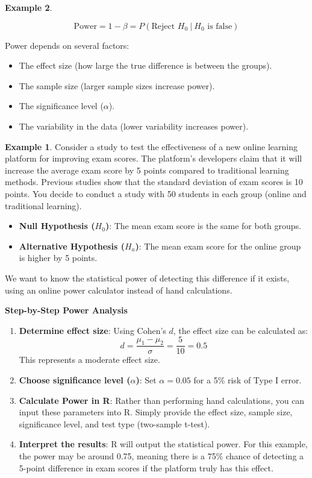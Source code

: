 \documentclass[
  11pt,
  oneside]{book}
\theoremstyle{definition}
\theoremstyle{definition}
\newtheorem{example}{Example}[chapter]
\theoremstyle{definition}
\theoremstyle{definition}
\theoremstyle{remark}
\begin{document}
\begin{example}
\begin{itemize}
  \[
  \text{Power} = 1 - \beta = P(\text{Reject } H_0 \>|\> H_0 \text{ is false})
  \]
\end{itemize}

Power depends on several factors:

\begin{itemize}
\item
  The effect size (how large the true difference is between the groups).
\item
  The sample size (larger sample sizes increase power).
\item
  The significance level (\(\alpha\)).
\item
  The variability in the data (lower variability increases power).
\end{itemize}

\begin{example}
Consider a study to test the effectiveness of a new online learning platform for improving exam scores. The platform's developers claim that it will increase the average exam score by 5 points compared to traditional learning methods. Previous studies show that the standard deviation of exam scores is 10 points. You decide to conduct a study with 50 students in each group (online and traditional learning).
\end{example}

\begin{itemize}
\item
  \textbf{Null Hypothesis (\(H_0\))}: The mean exam score is the same for both groups.
\item
  \textbf{Alternative Hypothesis (\(H_a\))}: The mean exam score for the online group is higher by 5 points.
\end{itemize}

We want to know the statistical power of detecting this difference if it exists, using an online power calculator instead of hand calculations.

\newpage

\textbf{Step-by-Step Power Analysis}

\begin{enumerate}
\def\labelenumi{\arabic{enumi}.}
\item
  \textbf{Determine effect size}:
  Using Cohen's \(d\), the effect size can be calculated as:
  \[
  d = \frac{\mu_1 - \mu_2}{\sigma} = \frac{5}{10} = 0.5
  \]
  This represents a moderate effect size.
\item
  \textbf{Choose significance level (\(\alpha\))}:
  Set \(\alpha = 0.05\) for a 5\% risk of Type I error.
\item
  \textbf{Calculate Power in R}:
  Rather than performing hand calculations, you can input these parameters into R. Simply provide the effect size, sample size, significance level, and test type (two-sample t-test).
\item
  \textbf{Interpret the results}:
  R will output the statistical power. For this example, the power may be around 0.75, meaning there is a 75\% chance of detecting a 5-point difference in exam scores if the platform truly has this effect.
\end{enumerate}


\end{example}
\end{document}
